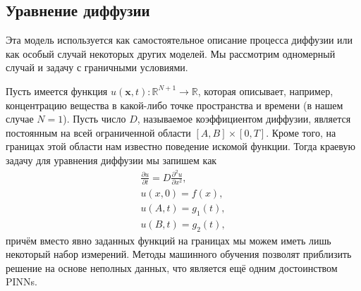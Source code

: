 \documentclass[a4paper, 12pt]{article}
\begin{document}



\subsection{Уравнение диффузии}

Эта модель используется как самостоятельное описание процесса диффузии или как особый случай некоторых других моделей. Мы рассмотрим одномерный случай и задачу с граничными условиями.

Пусть имеется функция $u(\mathbf{x}, t) : \mathbb{R}^{N + 1} \to \mathbb{R}$, которая описывает, например, концентрацию вещества в какой-либо точке пространства и времени (в нашем случае $N = 1$). Пусть число $D$, называемое коэффициентом диффузии, является постоянным на всей ограниченной области $[A, B] \times [0, T]$. Кроме того, на границах этой области нам известно поведение искомой функции. Тогда краевую задачу для уравнения диффузии мы запишем как
\begin{equation} \label{eq:diffusion:problemStatement}
\begin{gathered}
    \frac{\partial u}{\partial t} = D \frac{\partial^2 u}{\partial x^2}, \\
    u(x, 0) = f(x), \\
    u(A, t) = g_1(t), \\
    u(B, t) = g_2(t),
\end{gathered}
\end{equation}
причём вместо явно заданных функций на границах мы можем иметь лишь некоторый набор измерений. Методы машинного обучения позволят приблизить решение на основе неполных данных, что является ещё одним достоинством PINNs.
\end{document}
